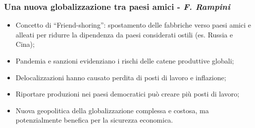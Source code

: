\documentclass{article}
\begin{document}
\subsubsection{Una nuova globalizzazione tra paesi amici - \textit{F. Rampini}}
\begin{itemize}
    \item Concetto di ``Friend-shoring'': spostamento delle fabbriche verso paesi amici e
        alleati per ridurre la dipendenza da paesi considerati ostili (es. Russia e Cina);
    \item Pandemia e sanzioni evidenziano i rischi delle catene produttive globali;
    \item Delocalizzazioni hanno causato perdita di posti di lavoro e inflazione;
    \item Riportare produzioni nei paesi democratici può creare più posti di lavoro;
    \item Nuova geopolitica della globalizzazione complessa e costosa, ma potenzialmente
        benefica per la sicurezza economica.
\end{itemize}

\newpage
\end{document}
